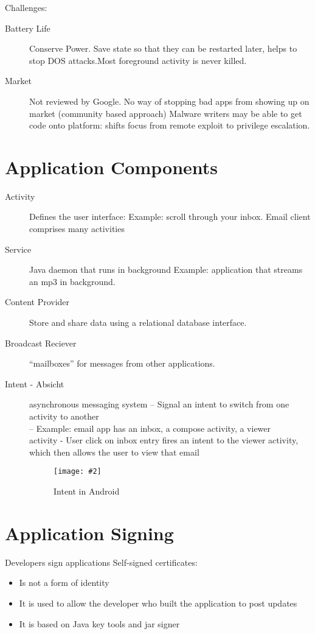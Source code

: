 \documentclass[a4paper,10pt]{scrreprt}
\newcommand{\pic}[2][figure]{\begin{figure}[h]
 \centering
 \texttt{[image: \#2]}
 \caption{#1}
\end{figure}
}
\begin{document}
Challenges:
\begin{description}
 \item [Battery Life] Conserve Power. Save state so that they can be restarted later, helps to stop DOS attacks.Most 
foreground activity is never killed.
\item [Market] Not reviewed by Google. No way of stopping bad apps from showing up on market (community based approach)
Malware writers may be able to get code onto platform: shifts
focus from remote exploit to privilege escalation.
\end{description}


\section{Application Components}
\begin{description}
 \item [Activity] Defines the user interface:
 Example: scroll through your inbox. Email client comprises many
activities
\item[Service]  Java daemon that runs in background Example: application that streams an mp3 in background.
\item[Content Provider] Store and share data using a relational database interface.
\item[Broadcast Reciever] “mailboxes” for messages from other applications.
\item [Intent - Absicht] asynchronous messaging system
– Signal an intent to switch from one activity to another \\
– Example: email app has an inbox, a compose activity, a viewer\\
activity
- User click on inbox entry fires an intent to the viewer activity,
which then allows the user to view that email\\
\pic[Intent in Android]{aint.png}
\end{description}

\section{Application Signing}
Developers sign applications
Self-signed certificates:\\
\begin{itemize}
\item  Is not a form of identity
\item It is used to allow the developer who built the application to
post updates
\item It is based on Java key tools and jar signer
\end{itemize}
\end{document}
